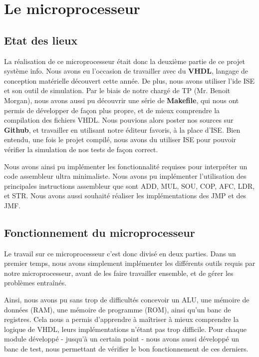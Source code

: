 \section{Le microprocesseur}
    \subsection{Etat des lieux}
    La réalisation de ce microprocesseur était donc la deuxième partie de ce projet système info. Nous avons eu l'occasion de travailler avec du \textbf{VHDL}, langage de conception matérielle découvert cette année. De plus, nous avons utiliser l'ide ISE et son outil de simulation. Par le biais de notre chargé de TP (Mr. Benoit Morgan), nous avons aussi pu découvrir une série de \textbf{Makefile}, qui nous ont permis de développer de façon plus propre, et de mieux comprendre la compilation des fichiers VHDL. Nous pouvions alors poster nos sources sur \textbf{Github}, et travailler en utilisant notre éditeur favoris, à la place d'ISE. Bien entendu, une fois le projet compilé, nous avons du utiliser ISE pour pouvoir vérifier la simulation de nos tests de façon correct.
    
    Nous avons ainsi pu implémenter les fonctionnalité requises pour interpréter un code assembleur ultra minimaliste. Nous avons pu implémenter l'utilisation des principales instructions assembleur que sont ADD, MUL, SOU, COP, AFC, LDR, et STR. Nous avons aussi souhaité réaliser les implémentations des JMP et des JMF.
    
    
    \subsection{Fonctionnement du microprocesseur}
    Le travail sur ce microprocesseur c'est donc divisé en deux parties. Dans un premier temps, nous avons simplement implémenter les différents outils requis par notre microprocesseur, avant de les faire travailler ensemble, et de gérer les problèmes entraînés.
    
    Ainsi, nous avons pu sans trop de difficultés concevoir un ALU, une mémoire de données (RAM), une mémoire de programme (ROM), ainsi qu'un banc de registres. Cela nous a permis d'apprendre à maîtriser à mieux comprendre la logique de VHDL, leurs implémentations n'étant pas trop difficile. Pour chaque module développé - jusqu'à un certain point - nous avons aussi développé un banc de test, nous permettant de vérifier le bon fonctionnement de ces derniers.
    
